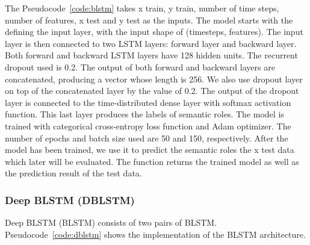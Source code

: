The Pseudocode~\ref{code:blstm} takes x train, y train, number of time steps, number of features, x test and y test as the inputs. The model starts with the defining the input layer, with the input shape of (timesteps, features). The input layer is then connected to two LSTM layers: forward layer and backward layer. Both forward and backward LSTM layers have 128 hidden units. The recurrent dropout used is 0.2. The output of both forward and backward layers are concatenated, producing a vector whose length is 256. We also use dropout layer on top of the concatenated layer by the value of 0.2. The output of the dropout layer is connected to the time-distributed dense layer with softmax activation function. This last layer produces the labels of semantic roles. The model is trained with categorical cross-entropy loss function and Adam optimizer. The number of epochs and batch size used are 50 and 150, respectively. After the model has been trained, we use it to predict the semantic roles the x test data which later will be evaluated. The function returns the trained model as well as the prediction result of the test data.

\subsubsection{Deep BLSTM (DBLSTM)}
Deep BLSTM (BLSTM) consists of two pairs of BLSTM. Pseudocode~\ref{code:dblstm} shows the implementation of the BLSTM architecture.

